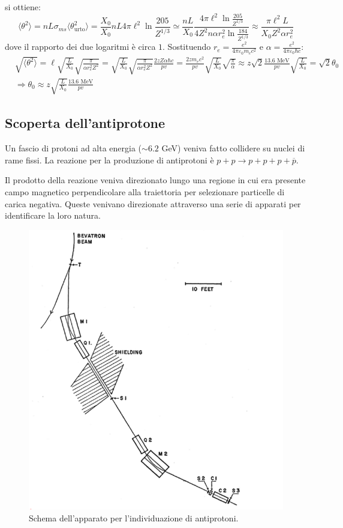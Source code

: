 \documentclass[10pt, a4paper]{scrartcl}
\numberwithin{equation}{subsection}
\theoremstyle{style1}
\begin{document}
si ottiene:
\[
	\langle \theta ^2 \rangle = nL\sigma _{ms} \langle \theta _{\text{urto}} ^2 \rangle = \frac{X_0}{X_0}n L 4 \pi \ell ^2 \ln \frac{205}{Z^{1 / 3} } \simeq \frac{nL}{X_0} \frac{4\pi \ell ^2 \ln \frac{205}{Z^{1 / 3} }}{4Z^2 n \alpha  r_e^2 \ln \frac{184}{Z^{1 / 3} }}\approx \frac{\pi \ell ^2 L}{X_0Z^2 \alpha r_e^2}
\] 
dove il rapporto dei due logaritmi \`e circa $1$. Sostituendo $r_e = \frac{e^2}{4\pi \varepsilon _0 m_e c^2}$ e $\alpha = \frac{e^2}{4\pi \varepsilon _0 \hbar  c}$:
\[
\begin{split}
	&\sqrt{\langle \theta ^2 \rangle} = \ell  \sqrt{\frac{L}{X_0}} \sqrt{\frac{\pi}{\alpha r_e^2 Z^2}} = \sqrt{\frac{L}{X_0}} \sqrt{\frac{\pi}{\alpha r_e^2 Z^2}} \frac{2zZ \alpha  \hbar  c}{pv}= \frac{2z m_e c^2}{pv} \sqrt{\frac{L}{X_0}}  \sqrt{\frac{\pi}{\alpha }}\approx z \sqrt{2} \frac{13.6 \text{ MeV}}{pv} \sqrt{\frac{L}{X_0}}  = \sqrt{2} \theta _0\\
	&\Rightarrow \theta _0 \approx z \sqrt{\frac{L}{X_0}} \frac{13.6 \text{ MeV}}{pv}
\end{split}
\] 

\subsection{Scoperta dell'antiprotone}
Un fascio di protoni ad alta energia ($\sim 6.2$ GeV) veniva fatto collidere su nuclei di rame fissi. La reazione per la produzione di antiprotoni \`e $p + p \to p+p+ p + \overline{p}$.

Il prodotto della reazione veniva direzionato lungo una regione in cui era presente campo magnetico perpendicolare alla traiettoria per selezionare particelle di carica negativa. Queste venivano direzionate attraverso una serie di apparati per identificare la loro natura. 
\begin{figure}[h!]
	\centering
	\includegraphics[width=.5\columnwidth]{bevatron.png}
	\caption{Schema dell'apparato per l'individuazione di antiprotoni.}
\end{figure}
\end{document}

